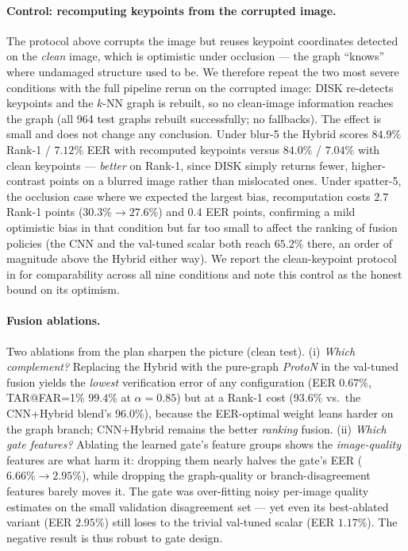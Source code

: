 \documentclass[11pt]{article}
\begin{document}
\paragraph{Control: recomputing keypoints from the corrupted image.} The protocol above
corrupts the image but reuses keypoint coordinates detected on the \emph{clean} image, which
is optimistic under occlusion --- the graph ``knows'' where undamaged structure used to be.
We therefore repeat the two most severe conditions with the full pipeline rerun on the
corrupted image: DISK re-detects keypoints and the $k$-NN graph is rebuilt, so no clean-image
information reaches the graph (all 964 test graphs rebuilt successfully; no fallbacks). The
effect is small and does not change any conclusion. Under blur-5 the Hybrid scores
$84.9\%$ Rank-1 / $7.12\%$ EER with recomputed keypoints versus $84.0\%$ / $7.04\%$ with
clean keypoints --- \emph{better} on Rank-1, since DISK simply returns fewer, higher-contrast
points on a blurred image rather than mislocated ones. Under spatter-5, the occlusion case
where we expected the largest bias, recomputation costs $2.7$ Rank-1 points
($30.3\%\to27.6\%$) and $0.4$ EER points, confirming a mild optimistic bias in that condition
but far too small to affect the ranking of fusion policies (the CNN and the val-tuned scalar
both reach $65.2\%$ there, an order of magnitude above the Hybrid either way). We report the
clean-keypoint protocol in  for comparability across all nine conditions and
note this control as the honest bound on its optimism.

\paragraph{Fusion ablations.} Two ablations from the plan sharpen the picture (clean test).
(i) \emph{Which complement?} Replacing the Hybrid with the pure-graph \emph{ProtoN} in the
val-tuned fusion yields the \emph{lowest} verification error of any configuration
(EER $0.67\%$, TAR@FAR=1\% $99.4\%$ at $\alpha{=}0.85$) but at a Rank-1 cost (93.6\% vs.\ the
CNN+Hybrid blend's 96.0\%), because the EER-optimal weight leans harder on the graph branch;
CNN+Hybrid remains the better \emph{ranking} fusion. (ii) \emph{Which gate features?}
Ablating the learned gate's feature groups shows the \emph{image-quality} features are what
harm it: dropping them nearly halves the gate's EER ($6.66\%\to2.95\%$), while dropping the
graph-quality or branch-disagreement features barely moves it. The gate was over-fitting
noisy per-image quality estimates on the small validation disagreement set --- yet even its
best-ablated variant (EER $2.95\%$) still loses to the trivial val-tuned scalar (EER
$1.17\%$). The negative result is thus robust to gate design.
\end{document}
